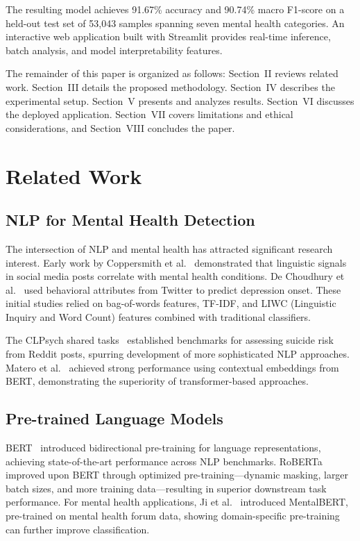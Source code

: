 \documentclass[conference, 10pt]{IEEEtran}
\begin{document}
The resulting model achieves 91.67\% accuracy and 90.74\% macro F1-score on a held-out test set of 53,043 samples spanning seven mental health categories. An interactive web application built with Streamlit provides real-time inference, batch analysis, and model interpretability features.

The remainder of this paper is organized as follows: Section~II reviews related work. Section~III details the proposed methodology. Section~IV describes the experimental setup. Section~V presents and analyzes results. Section~VI discusses the deployed application. Section~VII covers limitations and ethical considerations, and Section~VIII concludes the paper.


\section{Related Work}

\subsection{NLP for Mental Health Detection}

The intersection of NLP and mental health has attracted significant research interest. Early work by Coppersmith et al.~\cite{coppersmith2015clpsych} demonstrated that linguistic signals in social media posts correlate with mental health conditions. De Choudhury et al.~\cite{dechoudhury2013predicting} used behavioral attributes from Twitter to predict depression onset. These initial studies relied on bag-of-words features, TF-IDF, and LIWC (Linguistic Inquiry and Word Count) features combined with traditional classifiers.

The CLPsych shared tasks~\cite{zirikly2019clpsych} established benchmarks for assessing suicide risk from Reddit posts, spurring development of more sophisticated NLP approaches. Matero et al.~\cite{matero2019suicide} achieved strong performance using contextual embeddings from BERT, demonstrating the superiority of transformer-based approaches.

\subsection{Pre-trained Language Models}

BERT~\cite{devlin2019bert} introduced bidirectional pre-training for language representations, achieving state-of-the-art performance across NLP benchmarks. RoBERTa~\cite{liu2019roberta} improved upon BERT through optimized pre-training—dynamic masking, larger batch sizes, and more training data—resulting in superior downstream task performance. For mental health applications, Ji et al.~\cite{ji2022mentalbert} introduced MentalBERT, pre-trained on mental health forum data, showing domain-specific pre-training can further improve classification.
\end{document}
